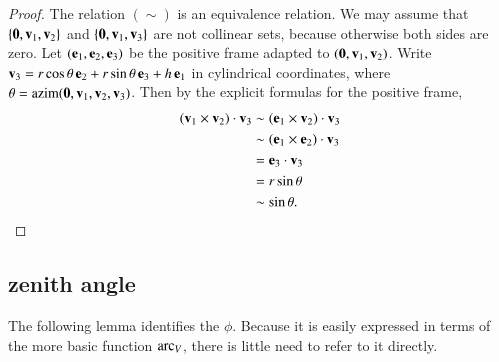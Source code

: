 \begin{proof}
  The relation $(\sim)$ is an equivalence relation.  We may assume that
  $\{{\mathbf 0},{\mathbf v}_1,{\mathbf v}_2\}$ and $\{{\mathbf 0},{\mathbf v}_1,{\mathbf v}_3\}$ are not collinear
  sets, because otherwise both sides are zero.  Let $({\mathbf e}_1,{\mathbf e}_2,{\mathbf e}_3)$ be
  the positive frame adapted to $({\mathbf 0},{\mathbf v}_1,{\mathbf v}_2)$.
Write ${\mathbf v}_3= r\cos\theta\, {\mathbf e}_2 + r\sin\theta \, {\mathbf e}_3 + h\, {\mathbf e}_1$ in
cylindrical coordinates, where $\theta =
{\operatorname{azim}}({\mathbf 0},{\mathbf v}_1,{\mathbf v}_2,{\mathbf v}_3)$.  Then by the explicit formulas for
the positive frame,
\begin{align*}
({\mathbf v}_1\times {\mathbf v}_2)\cdot {\mathbf v}_3 &\sim ({\mathbf e}_1\times {\mathbf v}_2)\cdot {\mathbf v}_3\\
&\sim ({\mathbf e}_1\times {\mathbf e}_2)\cdot {\mathbf v}_3\\
&= {\mathbf e}_3 \cdot {\mathbf v}_3\\
&= r\sin\theta \\
&\sim \sin\theta.
\end{align*}
\end{proof}


\subsection{zenith angle}
\label{sec:spherical}


%




The following lemma identifies the  $\phi$.  Because it is
easily expressed in terms of the more basic function $\operatorname{arc}_V$, there
is little need to refer to it directly.
%

